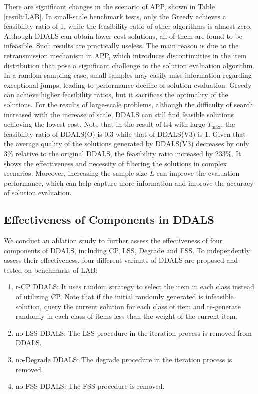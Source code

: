 \documentclass[lettersize,journal]{IEEEtran}
\begin{document}
There are significant changes in the scenario of APP, shown in Table \ref{result:LAB}. 
In small-scale benchmark tests, only the Greedy achieves a feasibility ratio of 1, while the feasibility ratio of other algorithms is almost zero. 
Although DDALS can obtain lower cost solutions, all of them are found to be infeasible. 
Such results are practically useless. 
The main reason is due to the retransmission mechanism in APP, which introduces discontinuities in the item distribution that pose a significant challenge to the solution evaluation algorithm. 
In a random sampling case, small samples may easily miss information regarding exceptional jumps, leading to performance decline of solution evaluation.
Greedy can achieve higher feasibility ratios, but it sacrifices the optimality of the solutions. 
For the results of large-scale problems, although the difficulty of search increased with the increase of scale,  DDALS can still find feasible solutions achieving the lowest cost.
Note that in the result of ls4 with large $T_{\max}$, the feasibility ratio of DDALS(O) is 0.3 while that of DDALS(V3) is 1. 
Given that the average quality of the solutions generated by DDALS(V3) decreases by only 3\% relative to the original DDALS, the feasibility ratio increased by 233\%.
It shows the effectiveness and necessity of filtering the solutions in complex scenarios. 
Moreover, increasing the sample size $L$ can improve the evaluation performance, which can help capture more information and improve the accuracy of solution evaluation.

\subsection{Effectiveness of Components in DDALS}
We conduct an ablation study to further assess the effectiveness of four components of DDALS, including CP, LSS, Degrade and FSS. 
To independently assess their effectiveness, four different variants of DDALS are proposed and tested on benchmarks of LAB:

\begin{enumerate}
\item r-CP DDALS: It uses random strategy to select the item in each class instead of utilizing CP. 
Note that if the initial randomly generated is infeasible solution, query the current solution for each class of item and re-generate randomly in each class of items less than the weight of the current item.
\item no-LSS DDALS: The LSS procedure in the iteration process is removed from DDALS.
\item no-Degrade DDALS: The degrade procedure in the iteration process is removed. 
\item no-FSS DDALS: The FSS procedure is removed. 
\end{enumerate}
\end{document}
